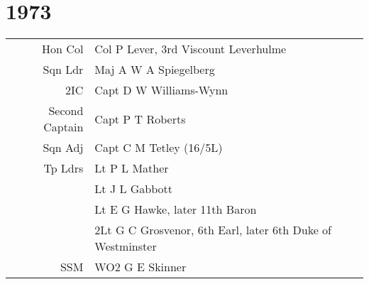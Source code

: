 \chapter*{1973}

\begin{center}
  \small
  \begin{tabular}{rl}
    Hon Col & Col P Lever, 3rd Viscount Leverhulme \\
    Sqn Ldr & Maj A W A Spiegelberg \\
    2IC & Capt D W Williams-Wynn \\
    Second Captain & Capt P T Roberts \\
    Sqn Adj & Capt C M Tetley (16/5L) \\
    Tp Ldrs & Lt P L Mather \\
      & Lt J L Gabbott \\
      & Lt E G Hawke, later 11th Baron \\
      & 2Lt G C Grosvenor, 6th Earl, later 6th Duke of Westminster \\
    SSM & WO2 G E Skinner \\
  \end{tabular}
\end{center}

